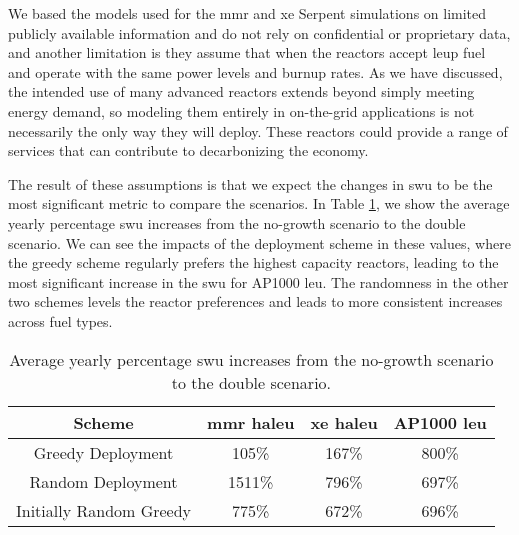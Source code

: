 We based the models used for the \gls{mmr} and \gls{xe} Serpent simulations on limited publicly available information and do not rely on confidential or proprietary data, and another limitation is they assume that when the reactors accept \gls{leup} fuel and operate with the same power levels and burnup rates. As we have discussed, the intended use of many advanced reactors extends beyond simply meeting energy demand, so modeling them entirely in on-the-grid applications is not necessarily the only way they will deploy. These reactors could provide a range of services that can contribute to decarbonizing the economy.

The result of these assumptions is that we expect the changes in \gls{swu} to be the most significant metric to compare the scenarios. In Table \ref{tab:swu_incs}, we show the average yearly percentage \gls{swu} increases from the no-growth scenario to the double scenario. We can see the impacts of the deployment scheme in these values, where the greedy scheme regularly prefers the highest capacity reactors, leading to the most significant increase in the \gls{swu} for AP1000 \gls{leu}. The randomness in the other two schemes levels the reactor preferences and leads to more consistent increases across fuel types.

\begin{table}[H]
    \centering
    \caption{Average yearly percentage \gls{swu} increases from the no-growth scenario to the double scenario.}
    \label{tab:swu_incs}
    \begin{tabular}{c c c c}
        \hline
        Scheme & \gls{mmr} \gls{haleu} & \gls{xe} \gls{haleu} & AP1000 \gls{leu}\\
        \hline
        Greedy Deployment & 105\% & 167\% & 800\% \\
        Random Deployment & 1511\% & 796\% & 697\% \\
        Initially Random Greedy & 775\% & 672\% & 696\% \\
        \hline
    \end{tabular}
\end{table}


